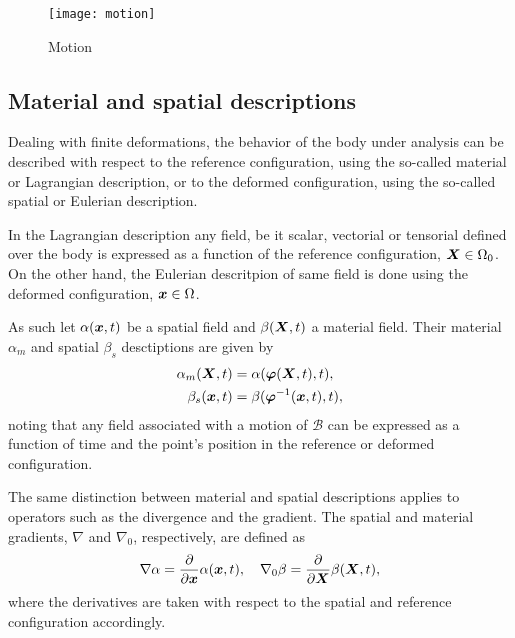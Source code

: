 \begin{figure}
  \centering
  \texttt{[image: motion]}
  \caption{Motion}
\label{fig:motion}
\end{figure}

\subsection{Material and spatial descriptions}

Dealing with finite deformations, the behavior of the body under analysis can be described with respect to the reference configuration, using the so-called material or Lagrangian description, or to the deformed configuration, using the so-called spatial or Eulerian description.

In the Lagrangian description any field, be it scalar, vectorial or tensorial defined over the body is expressed as a function of the reference configuration, $\bm{X} \in \Omega_0$.
On the other hand, the Eulerian descritpion of same field is done using the deformed configuration, $\bm{x}\in \Omega$.

As such let $\alpha(\bm{x},t)$ be a spatial field and $\beta(\bm{X}, t)$ a material field.
Their material $\alpha_m$ and spatial $\beta_s$ desctiptions are given by
\begin{align}
    \alpha_m(\bm{X}, t) &=\alpha(\bm{\varphi}(\bm{X}, t),t),\\
    \beta_s(\bm{x}, t) &= \beta(\bm{\varphi}^{-1}(\bm{x}, t),t),
\end{align}
noting that any field associated with a motion of $\mathscr{B}$ can be expressed as a function of time and the point's position in the reference or deformed configuration.

The same distinction between material and spatial descriptions applies to operators such as the divergence and the gradient.
The spatial and material gradients, $\nabla$ and $\nabla_0$, respectively, are defined as
\begin{equation}
    \nabla \alpha = \frac{\partial}{\partial \bm{x}}\alpha(\bm{x},t),\quad
    \nabla_0 \beta = \frac{\partial}{\partial \bm{X}}\beta (\bm{X}, t),
\end{equation}
where the derivatives are taken with respect to the spatial and reference configuration accordingly.

